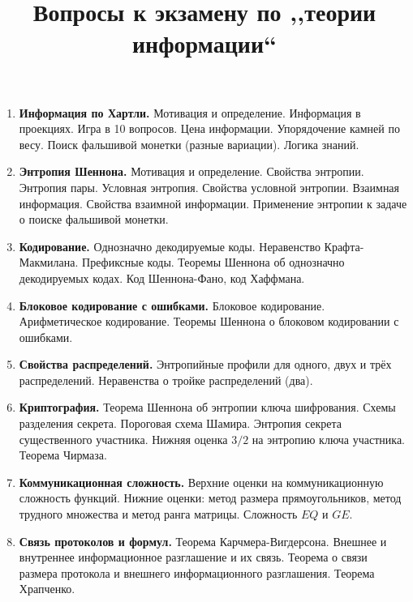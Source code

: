 \documentclass[12pt]{article}
\title{Вопросы к экзамену по ,,теории информации``}
\theoremstyle{definition}
\theoremstyle{plain}
\theoremstyle{remark}
\begin{document}
\maketitle


\begin{enumerate}
    \item \textbf{Информация по Хартли.} Мотивация и определение. Информация в проекциях.
        Игра в 10 вопросов. Цена информации. Упорядочение камней по весу.
        Поиск фальшивой монетки (разные вариации).
        Логика знаний.

    \item \textbf{Энтропия Шеннона.} Мотивация и определение. Свойства энтропии. Энтропия пары.
        Условная энтропия. Свойства условной энтропии.
	    Взаимная информация. Свойства взаимной информации.
	    Применение энтропии к задаче о поиске фальшивой монетки.
	    
	\item \textbf{Кодирование.} Однозначно декодируемые коды.
	Неравенство Крафта-Макмилана. Префиксные коды. 
	Теоремы Шеннона об однозначно декодируемых кодах.
	Код Шеннона-Фано, код Хаффмана. 

	\item \textbf{Блоковое кодирование с ошибками.}
	Блоковое кодирование. Арифметическое кодирование.
	Теоремы Шеннона о блоковом кодировании с ошибками.
	
	\item \textbf{Свойства распределений.} Энтропийные профили 
	для одного, двух и трёх распределений. Неравенства о тройке распределений (два).
	
	\item \textbf{Криптография.} Теорема Шеннона об энтропии ключа шифрования. Схемы разделения секрета. Пороговая схема Шамира.
	Энтропия секрета существенного участника.
	Нижняя оценка $3/2$ на энтропию ключа участника. Теорема Чирмаза.

	\item \textbf{Коммуникационная сложность.} Верхние оценки на
	коммуникационную сложность функций. Нижние оценки: метод
	размера прямоугольников, метод трудного множества и метод ранга
	матрицы. Сложность $EQ$ и $GE$.
	
	\item \textbf{Связь протоколов и формул.} Теорема Карчмера-Вигдерсона. Внешнее и внутреннее информационное разглашение и их связь. Теорема о связи размера протокола
	и внешнего информационного разглашения. Теорема Храпченко.
	

\end{enumerate}
\end{document}
